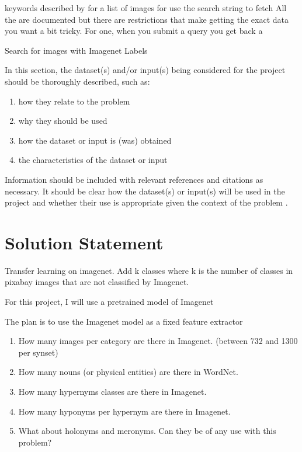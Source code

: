\documentclass[10pt, a4paper, twocolumn]{article} %
\begin{document}
keywords described by  for a list of images for use the search string to fetch All the  are  documented but there are restrictions that make getting the exact data you want a bit tricky.  For one, when you submit a query you get back a  

Search for images with Imagenet Labels

In this section, the dataset(s) and/or input(s) being considered for the project should be thoroughly described, such as: 

\begin{enumerate}
	\item how they relate to the problem
	\item why they should be used
	\item how the dataset or input is (was) obtained
	\item the characteristics of the dataset or input
\end{enumerate}

Information should be included with relevant references and citations as necessary. It should be clear how the dataset(s) or input(s) will be used in the project and whether their use is appropriate given the context of the problem \citep{Herrera:2016,Read:2011:CCM:2070617.2070629,Zhang:2006,DBLP:journals/corr/DaveTEV16,Miller:1995,Fellbaum:1998,Zhang:2017,2017arXiv171009230L,2017arXiv171008049W,2015arXiv151105616H,2014arXiv1406.5726W}.

\section{Solution Statement} %

Transfer learning on imagenet.  Add k classes where k is the number of classes in pixabay images that are not classified by Imagenet.

For this project, I will use a pretrained model of Imagenet

The plan is to use the Imagenet model as a fixed feature extractor

\begin{enumerate}
	\item How many images per category are there in Imagenet. (between 732 and 1300 per synset)
	\item How many nouns (or physical entities) are there in WordNet.
	\item How many hypernyms classes are there in Imagenet. 
	\item How many hyponyms per hypernym are there in Imagenet.
	\item What about holonyms and meronyms. Can they be of any use with this problem?
\end{enumerate}
\end{document}
